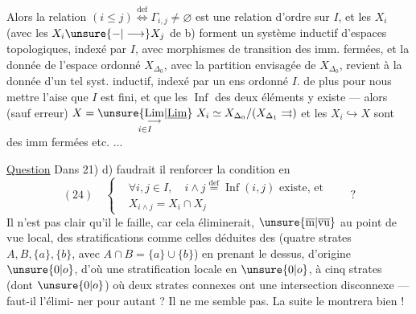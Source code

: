 Alors la relation $(i\leq j)\overset{\mathrm{def}}{\Longleftrightarrow}\Gamma_{i,j}\ne\varnothing$ est une
relation d'ordre sur $I$,  et les $X_i$
(avec les $X_i\unsure{-|\longrightarrow}X_j$ de b) forment un
système inductif d'espaces topologiques,
indexé par $I$, avec morphismes de
transition des imm. fermées, et
la donnée de l'espace  ordonné $X_{\Delta_0}$,
 avec la partition envisagée de $X_{\Delta_0}$,
revient à la donnée d'un tel syst.
inductif, indexé par un ens ordonné $I$.
 de plus pour nous mettre
 l'aise que $I$ est fini, et que les
$\operatorname{Inf}$ des deux éléments y existe --- alors
(sauf erreur) $X=\underset{i\in I}{\unsure{\underset{\longrightarrow}{\mathrm{Lim}}|\underline{\mathrm{Lim}}}}\ X_i\simeq
X_{\Delta_0}/(X_{\Delta_1}\rightrightarrows)$
et les $X_i\hookrightarrow X$ sont des imm fermées
etc. ...

\uline{Question} Dans 21) d) faudrait il
renforcer la condition en
\[
(24)\quad\left\{\begin{aligned}
&\forall i,j\in I,\quad i\wedge j\overset{\mathrm{def}}{=}\operatorname{Inf}(i,j)\text{ existe, et}\\
&X_{i\wedge j}=X_i\cap X_j
\end{aligned}\right.\qquad ?
\]
Il n'est pas clair qu'il le faille, car
cela éliminerait, $\unsure{\overline{\mathrm{m}}|\overline{\mathrm{vu}}}$ au point de vue local,
des stratifications comme celles déduites des 
(quatre strates $A,B,\{a\},\{b\}$, avec
$A\cap B=\{a\}\cup\{b\}$) en prenant le
 dessus,  d'origine $\unsure{0|o}$,
d'où une stratification locale en $\unsure{0|o}$, à cinq
strates (dont $\unsure{0|o}$) où deux strates connexes ont
une intersection disconnexe --- faut-il l'élimi-
ner pour autant ? Il  ne me
semble pas. La suite le montrera bien !

